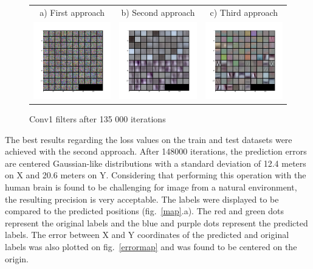 \begin{figure}[htb]
\centering
\begin{tabular}{ccc}
    a) First approach & b) Second approach & c) Third approach \\
    \includegraphics[width=0.3\linewidth]{images/regression/conv1_26_135000}&
    \includegraphics[width=0.3\linewidth]{images/regression/conv1_37_135000}&
    \includegraphics[width=0.3\linewidth]{images/regression/conv1_30_135000}\\
\end{tabular}
\caption{Conv1 filters after 135 000 iterations}
\label{1appfilter}
\label{2appfilter}
\label{3appfilter}
\end{figure}

The best results regarding the loss values on the train and test datasets were achieved with the second approach. After 148000 iterations, the prediction errors are centered Gaussian-like distributions with a standard deviation of 12.4 meters on X and 20.6 meters on Y. Considering that performing this operation with the human brain is found to be challenging for image from a natural environment, the resulting precision is very acceptable. The labels were displayed to be compared to the predicted positions (fig.~\ref{map}.a). The red and green dots represent the original labels and the blue and purple dots represent the predicted labels. The error between X and Y coordinates of the predicted and original labels was also plotted on fig.~\ref{errormap} and was found to be centered on the origin.

